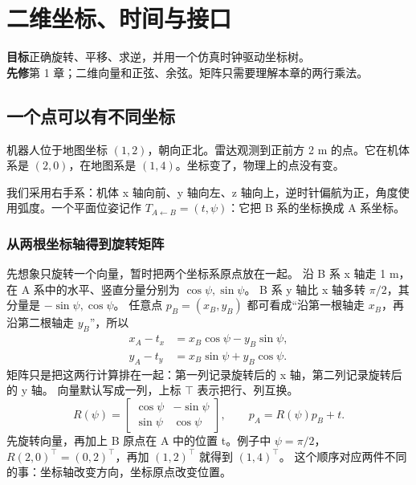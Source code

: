 \chapter{二维坐标、时间与接口}\label{ch:frames}
\begin{notebox}
\textbf{目标}\quad 正确旋转、平移、求逆，并用一个仿真时钟驱动坐标树。\\
\textbf{先修}\quad 第 1 章；二维向量和正弦、余弦。矩阵只需要理解本章的两行乘法。
\end{notebox}

\section{一个点可以有不同坐标}
机器人位于地图坐标 $(1,2)$，朝向正北。雷达观测到正前方 2 m 的点。它在机体系是 $(2,0)$，在地图系是 $(1,4)$。坐标变了，物理上的点没有变。

我们采用右手系：机体 x 轴向前、y 轴向左、z 轴向上，逆时针偏航为正，角度使用弧度。一个平面位姿记作 $T_{A\leftarrow B}=(t,\psi)$：它把 B 系的坐标换成 A 系坐标。

\subsection*{从两根坐标轴得到旋转矩阵}
先想象只旋转一个向量，暂时把两个坐标系原点放在一起。
沿 B 系 x 轴走 1 m，在 A 系中的水平、竖直分量分别为 $\cos\psi,\sin\psi$。
B 系 y 轴比 x 轴多转 $\pi/2$，其分量是 $-\sin\psi,\cos\psi$。
任意点 $p_B=(x_B,y_B)$ 都可看成“沿第一根轴走 $x_B$，再沿第二根轴走 $y_B$”，所以
\begin{align}
x_A-t_x&=x_B\cos\psi-y_B\sin\psi,\\
y_A-t_y&=x_B\sin\psi+y_B\cos\psi.
\end{align}
矩阵只是把这两行计算排在一起：第一列记录旋转后的 x 轴，第二列记录旋转后的 y 轴。
向量默认写成一列，上标 $\top$ 表示把行、列互换。
\begin{equation}
R(\psi)=\begin{bmatrix}\cos\psi&-\sin\psi\\ \sin\psi&\cos\psi\end{bmatrix},
\qquad p_A=R(\psi)p_B+t.
\label{eq:transform}
\end{equation}
先旋转向量，再加上 B 原点在 A 中的位置 t。例子中 $\psi=\pi/2$，
$R(2,0)^\top=(0,2)^\top$，再加 $(1,2)^\top$ 就得到 $(1,4)^\top$。
这个顺序对应两件不同的事：坐标轴改变方向，坐标原点改变位置。

